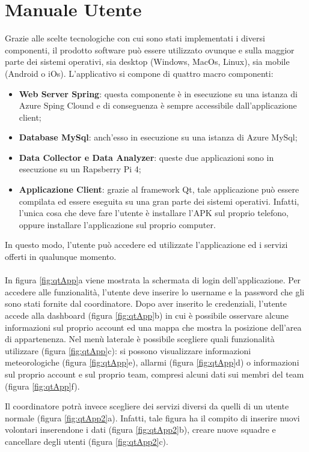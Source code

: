 \section{Manuale Utente}
Grazie alle scelte tecnologiche con cui sono stati implementati i diversi componenti, il prodotto software può essere utilizzato ovunque e sulla maggior parte dei sistemi operativi, sia desktop (Windows, MacOs, Linux), sia mobile (Android o iOs).
L'applicativo si compone di quattro macro componenti:
\begin{itemize}
	\item \textbf{Web Server Spring}: questa componente è in esecuzione su una istanza di Azure Sping Clound e di conseguenza è sempre accessibile dall'applicazione client;
	\item \textbf{Database MySql}: anch'esso in esecuzione su una istanza di Azure MySql;
	\item \textbf{Data Collector e Data Analyzer}: queste due applicazioni sono in esecuzione su un Rapsberry Pi 4;
	\item \textbf{Applicazione Client}: grazie al framework Qt, tale applicazione può essere compilata ed essere eseguita su una gran parte dei sistemi operativi. Infatti, l'unica cosa che deve fare l'utente è installare l'APK sul proprio telefono, oppure installare l'applicazione sul proprio computer. 
\end{itemize}

In questo modo, l'utente può accedere ed utilizzate l'applicazione ed i servizi offerti in qualunque momento. 
\\
\\
In figura \ref{fig:qtApp}a viene mostrata la schermata di login dell'applicazione. Per accedere alle funzionalità, l'utente deve inserire lo username e la password che gli sono stati fornite dal coordinatore. 
Dopo aver inserito le credenziali, l'utente accede alla dashboard (figura \ref{fig:qtApp}b) in cui è possibile osservare alcune informazioni sul proprio account ed una mappa che mostra la posizione dell'area di appartenenza.
Nel menù laterale è possibile scegliere quali funzionalità utilizzare (figura \ref{fig:qtApp}c): si possono visualizzare informazioni meteorologiche (figura \ref{fig:qtApp}e), allarmi (figura \ref{fig:qtApp}d) o informazioni sul proprio account e sul proprio team, compresi alcuni dati sui membri del team (figura \ref{fig:qtApp}f).

Il coordinatore potrà invece scegliere dei servizi diversi da quelli di un utente normale (figura \ref{fig:qtApp2}a). Infatti, tale figura ha il compito di inserire nuovi volontari inserendone i dati (figura \ref{fig:qtApp2}b), creare nuove squadre e cancellare degli utenti (figura \ref{fig:qtApp2}c).

